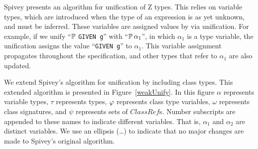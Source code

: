 Spivey \cite{spivey90} presents an algorithm for unification of Z
types. This relies on variable types, which are introduced when the
type of an expression is as yet unknown, and must be
inferred. These variables are assigned values by via unification. For
example, if we unify ``$\power$ {\tt GIVEN g}'' with ``$\power \alpha_1$'', in
which $\alpha_1$ is a type variable, the unification assigns the value
``{\tt GIVEN g}'' to $\alpha_1$. This variable assignment propagates
throughout the specification, and other types that refer to $\alpha_1$
are also updated.

We extend Spivey's algorithm for unification by including class
types. This extended algorithm is presented in
Figure~\ref{weakUnify}. In this figure $\alpha$ represents variable
types, $\tau$ represents types, $\varphi$ represents class type
variables, $\omega$ represents class signatures, and $\psi$ represents
sets of $ClassRef$s. Number subscripts are appended to these
names to indicate different variables. That is, $\alpha_1$ and
$\alpha_2$ are distinct variables. We use an ellipsis (\ldots) to
indicate that no major changes are made to Spivey's original
algorithm.

